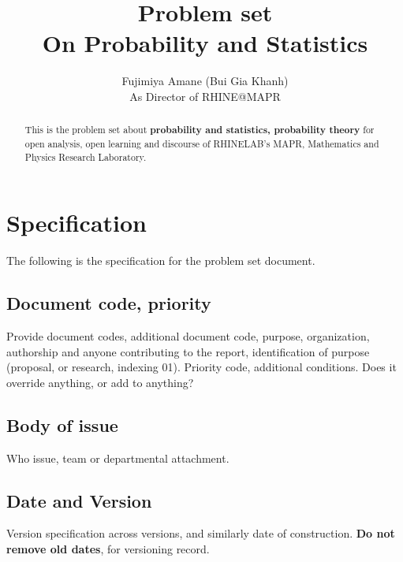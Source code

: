 \documentclass[10pt,a4paper]{article}
\title{\textbf{Problem set} \\ {\small On Probability and Statistics}} %
\author{Fujimiya Amane (Bui Gia Khanh) \\ {\small As Director of RHINE@MAPR}} %
\affiliation{} %
\begin{document}
\maketitle

\begin{abstract}
    \noindent
    This is the problem set about \textbf{probability and statistics, probability theory} for open analysis, open learning and discourse of RHINELAB's MAPR, Mathematics and Physics Research Laboratory. 

\end{abstract}

\vspace{2.5cm}



\thispagestyle{firstpage}

\pagebreak


\newgeometry{} %

\section{Specification}
\label{sec:spec}

The following is the specification for the problem set document. 

\subsection{Document code, priority}

Provide document codes, additional document code, purpose, organization, authorship and anyone contributing to the report, identification of purpose (proposal, or research, indexing 01). Priority code, additional conditions. Does it override anything, or add to anything?

\subsection{Body of issue}

Who issue, team or departmental attachment. 

\subsection{Date and Version}

Version specification across versions, and similarly date of construction. \textbf{Do not remove old dates}, for versioning record. 
\end{document}

